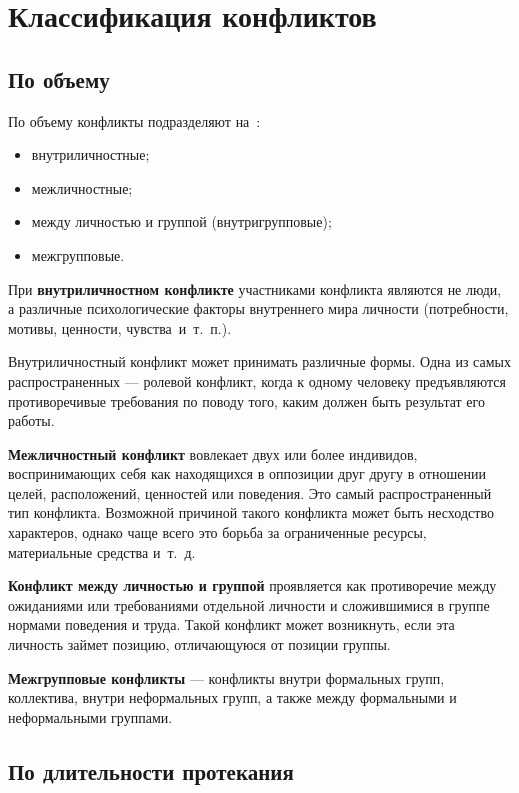 \chapter{\label{head:03}Классификация конфликтов}

\section{По объему}

По объему конфликты подразделяют на~\cite{book08}:
\begin{itemize}
    \item внутриличностные;
    \item межличностные;
    \item между личностью и группой (внутригрупповые);
    \item межгрупповые.
\end{itemize}

При \textbf{внутриличностном конфликте} участниками конфликта являются не люди,
а различные психологические факторы внутреннего мира личности (потребности,
мотивы, ценности, чувства~и~т.~п.).

Внутриличностный конфликт может принимать различные формы. Одна из самых
распространенных --- ролевой конфликт, когда к одному человеку предъявляются
противоречивые требования по поводу того, каким должен быть результат его
работы.

\textbf{Межличностный конфликт} вовлекает двух или более индивидов,
воспринимающих себя как находящихся в оппозиции друг другу в отношении целей,
расположений, ценностей или поведения. Это самый распространенный тип конфликта.
Возможной причиной такого конфликта может быть несходство характеров, однако
чаще всего это борьба за ограниченные ресурсы, материальные средства и~т.~д. 

\textbf{Конфликт между личностью и группой} проявляется как противоречие между
ожиданиями или требованиями отдельной личности и сложившимися в группе нормами
поведения и труда. Такой конфликт может возникнуть, если эта личность займет
позицию, отличающуюся от позиции группы.

\textbf{Межгрупповые конфликты} --- конфликты внутри формальных групп,
коллектива, внутри неформальных групп, а также между формальными и неформальными
группами.

\clearpage
\section{По длительности протекания}

